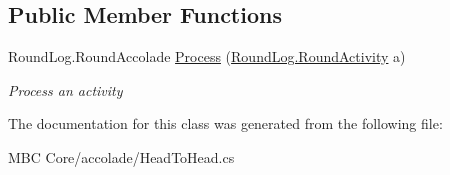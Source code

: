\subsection*{Public Member Functions}
\begin{DoxyCompactItemize}
\item 
\hypertarget{class_m_b_c_1_1_core_1_1mbc_1_1accolade_1_1_head_to_head_afd0bb6e5b731cdd4a638a0b91445193f}{Round\-Log.\-Round\-Accolade \hyperlink{class_m_b_c_1_1_core_1_1mbc_1_1accolade_1_1_head_to_head_afd0bb6e5b731cdd4a638a0b91445193f}{Process} (\hyperlink{class_m_b_c_1_1_core_1_1_round_log_1_1_round_activity}{Round\-Log.\-Round\-Activity} a)}\label{class_m_b_c_1_1_core_1_1mbc_1_1accolade_1_1_head_to_head_afd0bb6e5b731cdd4a638a0b91445193f}

\begin{DoxyCompactList}\small\item\em Process an activity\end{DoxyCompactList}\end{DoxyCompactItemize}


The documentation for this class was generated from the following file\-:\begin{DoxyCompactItemize}
\item 
M\-B\-C Core/accolade/Head\-To\-Head.\-cs\end{DoxyCompactItemize}
